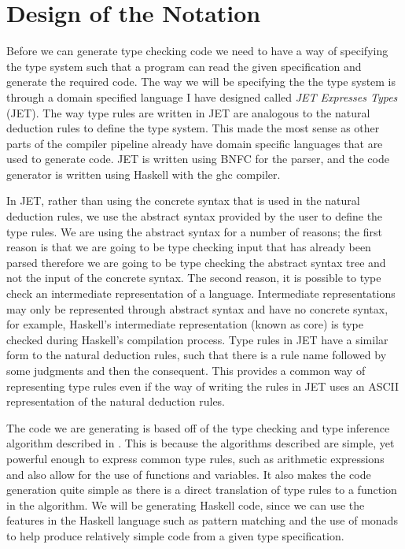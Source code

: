 \chapter{Design of the Notation}
\label{chap:Method}
Before we can generate type checking code we need to have a way of specifying the type system such that a program can read the given specification and generate the required code.
The way we will be specifying the the type system is through a domain specified language I have designed called \textit{JET Expresses Types} (JET).
The way type rules are written in JET are analogous to the natural deduction rules to define the type system.
This made the most sense as other parts of the compiler pipeline already have domain specific languages that are used to generate code.
JET is written using BNFC\cite{Pellauer2004BNFCM} for the parser, and the code generator is written using Haskell\cite{marlow2010haskell} with the ghc compiler\cite{marlow2004glasgow}.

In JET, rather than using the concrete syntax that is used in the natural deduction rules, we use the abstract syntax provided by the user to define the type rules.
We are using the abstract syntax for a number of reasons; the first reason is that we are going to be type checking input that has already been parsed therefore we are going to be type checking the abstract syntax tree and not the input of the concrete syntax.
The second reason, it is possible to type check an intermediate representation of a language.
Intermediate representations may only be represented through abstract syntax and have no concrete syntax, for example, Haskell's intermediate representation (known as core) is type checked during Haskell's compilation process\cite{marlow2004glasgow}.
Type rules in JET have a similar form to the natural deduction rules, such that there is a rule name followed by some judgments and then the consequent.
This provides a common way of representing type rules even if the way of writing the rules in JET uses an ASCII representation of the natural deduction rules.

The code we are generating is based off of the type checking and type inference algorithm described in \textcite{ranta2012implementing}.
This is because the algorithms described are simple, yet powerful enough to express common type rules, such as arithmetic expressions and also allow for the use of functions and variables.
It also makes the code generation quite simple as there is a direct translation of type rules to a function in the algorithm.
We will be generating Haskell code, since we can use the features in the Haskell language such as pattern matching and the use of monads to help produce relatively simple code from a given type specification.

